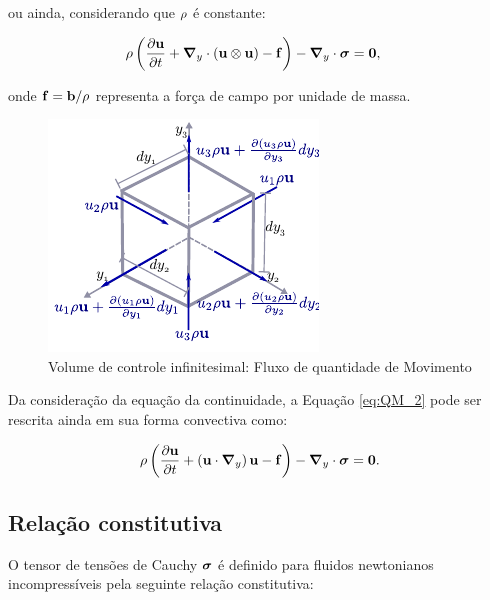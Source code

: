 \noindent ou ainda, considerando que $\rho$ é constante:

\begin{align}
	\rho\left(\frac{\partial\mathbf{u}}{\partial t} + \boldsymbol{\nabla}_y \cdot \left(\mathbf{u}\otimes\mathbf{u}\right) - \mathbf{f} \right) - \boldsymbol{\nabla}_y \cdot \boldsymbol{\sigma}  &= \mathbf{0}, \label{eq:QM_2} 
\end{align}

\noindent onde $\mathbf{f} = \mathbf{b}/\rho$ representa a força de campo por unidade de massa.

\begin{figure}[!htbp]
	\caption{Volume de controle infinitesimal: Fluxo de quantidade de Movimento}
	\begin{center}
	\includegraphics[scale=1.5,trim=0cm 0.0cm 0cm 0.0cm, clip=true]{Imagens/Cap2/volInf_consQtdeMov.pdf}	
	\end{center}
	\label{fig:volInf_consQtdeMov}
\end{figure}

Da consideração da equação da continuidade, a Equação \eqref{eq:QM_2} pode ser rescrita ainda em sua forma convectiva como:

\begin{align}
	\rho\left(\frac{\partial\mathbf{u}}{\partial t} + \left( \mathbf{u} \cdot \boldsymbol{\nabla}_y \right)  \mathbf{u}  - \mathbf{f} \right) - \boldsymbol{\nabla}_y \cdot \boldsymbol{\sigma} = \mathbf{0}. \label{eq:Navier-Stokes} 
\end{align}

\subsection{Relação constitutiva}

O tensor de tensões de Cauchy $\boldsymbol{\sigma}$ é definido para fluidos newtonianos incompressíveis pela seguinte relação constitutiva:

